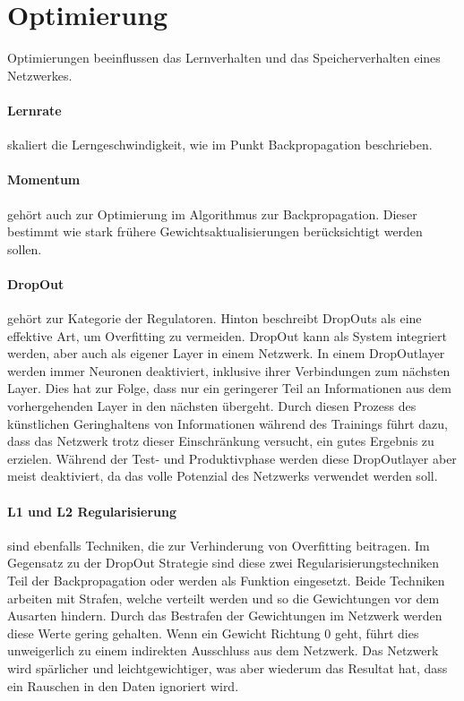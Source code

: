 \section{Optimierung}

Optimierungen beeinflussen das Lernverhalten und das Speicherverhalten eines Netzwerkes.

\paragraph{Lernrate} skaliert die Lerngeschwindigkeit, wie im Punkt Backpropagation beschrieben.

\paragraph{Momentum} gehört auch zur Optimierung im Algorithmus zur Backpropagation.
Dieser bestimmt wie stark frühere Gewichtsaktualisierungen berücksichtigt werden sollen. 

\paragraph{DropOut} gehört zur Kategorie der Regulatoren. 
Hinton \cite{krizhevsky2012imagenet} beschreibt DropOuts als eine effektive Art, um Overfitting zu vermeiden.
DropOut kann als System integriert werden, aber auch als eigener Layer in einem Netzwerk.
In einem DropOutlayer werden immer Neuronen deaktiviert, inklusive ihrer Verbindungen zum nächsten Layer.
Dies hat zur Folge, dass nur ein geringerer Teil an Informationen aus dem vorhergehenden Layer in den nächsten übergeht. 
Durch diesen Prozess des künstlichen Geringhaltens von Informationen während des Trainings führt dazu, dass das Netzwerk trotz dieser Einschränkung versucht, ein gutes Ergebnis zu erzielen. 
Während der Test- und Produktivphase werden diese DropOutlayer aber meist deaktiviert, da das volle Potenzial des Netzwerks verwendet werden soll.

\paragraph{L1 und L2 Regularisierung} sind ebenfalls Techniken, die zur Verhinderung von Overfitting beitragen.
Im Gegensatz zu der DropOut Strategie sind diese zwei Regularisierungstechniken Teil der Backpropagation oder werden als Funktion eingesetzt.
Beide Techniken arbeiten mit Strafen, welche verteilt werden und so die Gewichtungen vor dem Ausarten hindern. 
Durch das Bestrafen der Gewichtungen im Netzwerk werden diese Werte gering gehalten. %
Wenn ein Gewicht Richtung $0$ geht, führt dies unweigerlich zu einem indirekten Ausschluss aus dem Netzwerk.
Das Netzwerk wird spärlicher und leichtgewichtiger, was aber wiederum das Resultat hat, dass ein Rauschen in den Daten ignoriert wird.

